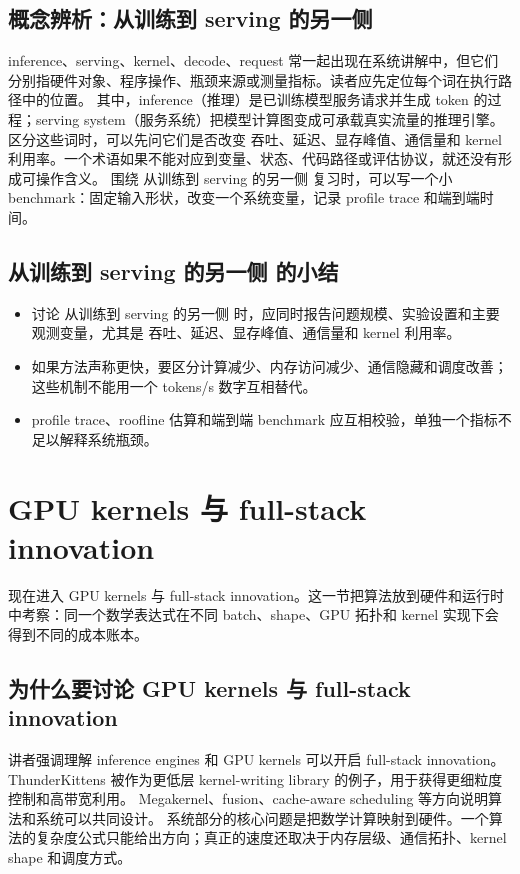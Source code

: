 \documentclass[a4paper]{article}
\begin{document}
\subsection{概念辨析：从训练到 serving 的另一侧}
inference、serving、kernel、decode、request 常一起出现在系统讲解中，但它们分别指硬件对象、程序操作、瓶颈来源或测量指标。读者应先定位每个词在执行路径中的位置。
其中，inference（推理）是已训练模型服务请求并生成 token 的过程；serving system（服务系统）把模型计算图变成可承载真实流量的推理引擎。
区分这些词时，可以先问它们是否改变 吞吐、延迟、显存峰值、通信量和 kernel 利用率。一个术语如果不能对应到变量、状态、代码路径或评估协议，就还没有形成可操作含义。
围绕 从训练到 serving 的另一侧 复习时，可以写一个小 benchmark：固定输入形状，改变一个系统变量，记录 profile trace 和端到端时间。
\subsection{从训练到 serving 的另一侧 的小结}
\begin{itemize}
\item 讨论 从训练到 serving 的另一侧 时，应同时报告问题规模、实验设置和主要观测变量，尤其是 吞吐、延迟、显存峰值、通信量和 kernel 利用率。
\item 如果方法声称更快，要区分计算减少、内存访问减少、通信隐藏和调度改善；这些机制不能用一个 tokens/s 数字互相替代。
\item profile trace、roofline 估算和端到端 benchmark 应互相校验，单独一个指标不足以解释系统瓶颈。
\end{itemize}
\section{GPU kernels 与 full-stack innovation}
现在进入 GPU kernels 与 full-stack innovation。这一节把算法放到硬件和运行时中考察：同一个数学表达式在不同 batch、shape、GPU 拓扑和 kernel 实现下会得到不同的成本账本。
\subsection{为什么要讨论 GPU kernels 与 full-stack innovation}
讲者强调理解 inference engines 和 GPU kernels 可以开启 full-stack innovation。
ThunderKittens 被作为更低层 kernel-writing library 的例子，用于获得更细粒度控制和高带宽利用。
Megakernel、fusion、cache-aware scheduling 等方向说明算法和系统可以共同设计。
系统部分的核心问题是把数学计算映射到硬件。一个算法的复杂度公式只能给出方向；真正的速度还取决于内存层级、通信拓扑、kernel shape 和调度方式。
\end{document}
